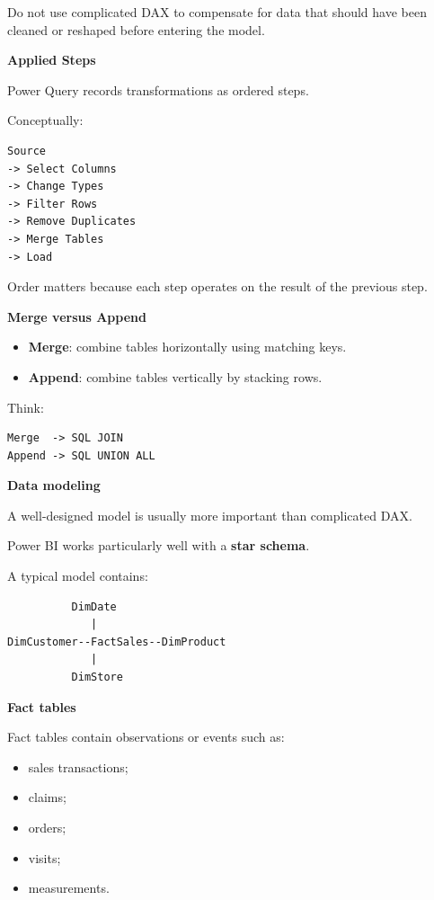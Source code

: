 \documentclass[11pt,letterpaper]{article}
\begin{document}
Do not use complicated DAX to compensate for data that should have been
cleaned or reshaped before entering the model.

\textbf{Applied Steps}

Power Query records transformations as ordered steps.

Conceptually:

\begin{lstlisting}
Source
-> Select Columns
-> Change Types
-> Filter Rows
-> Remove Duplicates
-> Merge Tables
-> Load
\end{lstlisting}

Order matters because each step operates on the result of the previous step.

\textbf{Merge versus Append}

\begin{itemize}[leftmargin=*]
    \item \textbf{Merge}: combine tables horizontally using matching keys.
    \item \textbf{Append}: combine tables vertically by stacking rows.
\end{itemize}

Think:

\begin{lstlisting}
Merge  -> SQL JOIN
Append -> SQL UNION ALL
\end{lstlisting}



\textbf{Data modeling}

A well-designed model is usually more important than complicated DAX.

Power BI works particularly well with a \textbf{star schema}.

A typical model contains:

\begin{lstlisting}
          DimDate
             |
DimCustomer--FactSales--DimProduct
             |
          DimStore
\end{lstlisting}

\textbf{Fact tables}

Fact tables contain observations or events such as:

\begin{itemize}[leftmargin=*]
    \item sales transactions;
    \item claims;
    \item orders;
    \item visits;
    \item measurements.
\end{itemize}
\end{document}
